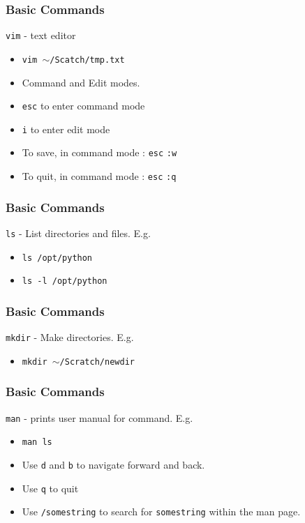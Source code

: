 \documentclass{beamer}
\newcommand{\code}[1]{\colorbox{codegray}{\texttt{#1}}}
\begin{document}

\begin{frame}
\frametitle{Basic Commands}
\code{vim} - text editor
\bigskip
\begin{itemize}
    \item \code{vim $\sim$/Scatch/tmp.txt}
    \bigskip
    \item Command and Edit modes.
    \bigskip
    \item \code{esc} to enter command mode
    \bigskip
    \item \code{i} to enter edit mode
    \bigskip
    \item To save, in command mode : \code{esc} \code{:w}
    \bigskip
    \item To quit, in command mode : \code{esc} \code{:q}
\end{itemize}
\end{frame}

\begin{frame}
\frametitle{Basic Commands}
\code{ls} - List directories and files. E.g.
\bigskip
\begin{itemize}
    \item \code{ls /opt/python }
    \bigskip

    \item \code{ls -l /opt/python} 
\end{itemize}
\end{frame}



\begin{frame}
\frametitle{Basic Commands}
\code{mkdir} - Make directories. E.g.
\bigskip
\begin{itemize}
    \item \code{mkdir $\sim$/Scratch/newdir}
\end{itemize}
\end{frame}


\begin{frame}
\frametitle{Basic Commands}
\code{man} - prints user manual for command. E.g.
\bigskip
\begin{itemize}
    \item \code{man ls}
    \bigskip
    \item Use \code{d} and \code{b} to navigate forward and back.
    \bigskip
    \item Use \code{q} to quit
    \bigskip
    \item Use \code{/somestring} to search for \code{somestring} within the man page.
\end{itemize}
\end{frame}
\end{document}
